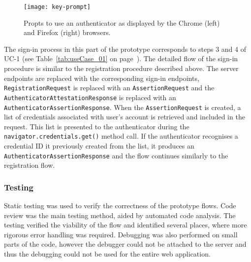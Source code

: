 \begin{figure}[htb]
    \centering
    \texttt{[image: key-prompt]}
    \caption{Propts to use an authenticator as displayed by the Chrome (left) and Firefox (right) browsers.}
    \label{fig:key-prompts}
\end{figure}

The sign-in process in this part of the prototype corresponds to steps 3 and 4 of UC-1 (see Table~\ref{tab:useCase_01} on page~\pageref{tab:useCase_01}). The detailed flow of the sign-in procedure is similar to the registration procedure described above. The server endpoints are replaced with the corresponding sign-in endpoints, \texttt{RegistrationRequest} is replaced with an \texttt{AssertionRequest} and the \texttt{AuthenticatorAttestationResponse} is replaced with an \texttt{AuthenticatorAssertionResponse}. When the \texttt{AssertionRequest} is created, a list of credentials associated with user's account is retrieved and included in the request. This list is presented to the authenticator during the \texttt{navigator.credentials.get()} method call. If the authenticator recognises a credential ID it previously created from the list, it produces an \texttt{AuthenticatorAssertionResponse} and the flow continues similarly to the registration flow.

\subsubsection{Testing}
Static testing was used to verify the correctness of the prototype flows. Code review was the main testing method, aided by automated code analysis. The testing verified the viability of the flow and identified several places, where more rigorous error handling was required. Debugging was also performed on small parts of the code, however the debugger could not be attached to the server and thus the debugging could not be used for the entire web application.